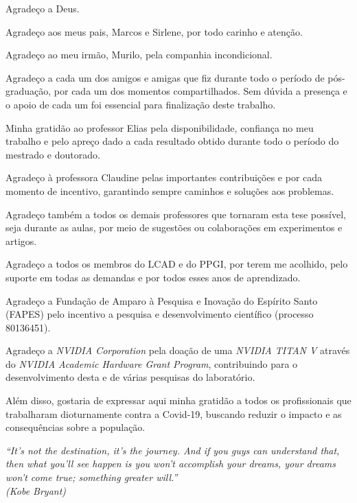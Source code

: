 \documentclass[
	12pt,				%
	openright,			%
	twoside,			%
	a4paper,			%
	english,			%
	french,				%
	spanish,			%
	brazil				%
	]{abntex2}
\begin{document}
\begin{agradecimentos}
Agradeço a Deus.

Agradeço aos meus pais, Marcos e Sirlene, por todo carinho e atenção.

Agradeço ao meu irmão, Murilo, pela companhia incondicional.

Agradeço a cada um dos amigos e amigas que fiz durante todo o período de pós-graduação, por cada um dos momentos compartilhados. Sem dúvida a presença e o apoio de cada um foi essencial para finalização deste trabalho.

Minha gratidão ao professor Elias pela disponibilidade, confiança no meu trabalho e pelo apreço dado a cada resultado obtido durante todo o período do mestrado e doutorado.

Agradeço à professora Claudine pelas importantes contribuições e por cada momento de incentivo, garantindo sempre caminhos e soluções aos problemas.

Agradeço também a todos os demais professores que tornaram esta tese possível, seja durante as aulas, por meio de sugestões ou colaborações em experimentos e artigos.

Agradeço a todos os membros do LCAD e do PPGI, por terem me acolhido, pelo suporte em todas as demandas e por todos esses anos de aprendizado.

Agradeço a Fundação de Amparo à Pesquisa e Inovação do Espírito Santo (FAPES) pelo incentivo a pesquisa e desenvolvimento científico (processo 80136451).

Agradeço a \textit{NVIDIA Corporation} pela doação de uma \textit{NVIDIA TITAN V} através do \textit{NVIDIA Academic Hardware Grant Program}, contribuindo para o desenvolvimento desta e de várias pesquisas do laboratório.

Além disso, gostaria de expressar aqui minha gratidão a todos os profissionais que trabalharam dioturnamente contra a Covid-19, buscando reduzir o impacto e as consequências sobre a população.

\end{agradecimentos}


\begin{epigrafe}
    \vspace*{\fill}
	\begin{flushright}
		\textit{``It’s not the destination, it’s the journey. And if you guys can understand that, then what you’ll see happen is you won’t accomplish your dreams, your dreams won’t come true; something greater will.''\\
		(Kobe Bryant)}
	\end{flushright}
\end{epigrafe}
\end{document}
